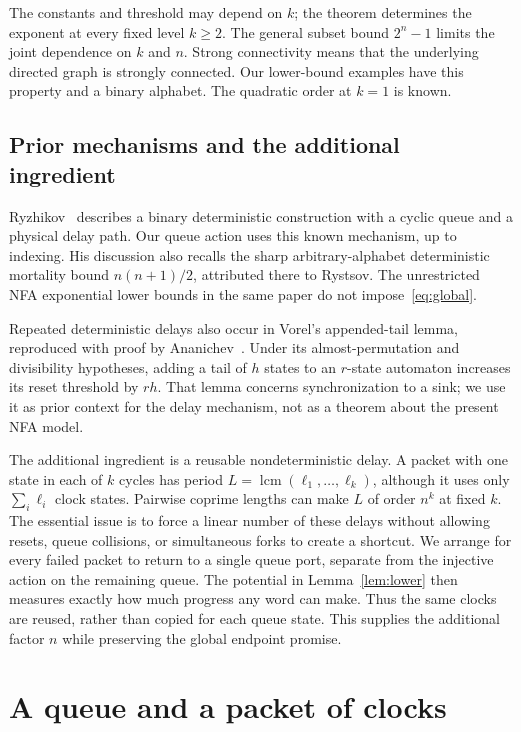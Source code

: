 \documentclass[acmsmall,screen,nonacm,11pt]{acmart}
\DeclareMathOperator{\lcm}{lcm}
\begin{document}
The constants and threshold may depend on $k$; the theorem determines the
exponent at every fixed level $k\geq2$. The general subset bound $2^n-1$
limits the joint dependence on $k$ and $n$. Strong connectivity means that
the underlying directed graph is strongly connected. Our lower-bound
examples have this property and a binary alphabet. The quadratic order
at $k=1$ is known.

\subsection{Prior mechanisms and the additional ingredient}

Ryzhikov~\cite[Section~4]{R2024} describes a binary deterministic construction
with a cyclic queue and a physical delay path. Our queue action uses this
known mechanism, up to indexing. His discussion also recalls the sharp
arbitrary-alphabet deterministic mortality bound $n(n+1)/2$, attributed
there to Rystsov. The unrestricted NFA exponential lower bounds in the same
paper do not impose~\eqref{eq:global}.

Repeated deterministic delays also occur in Vorel's appended-tail lemma,
reproduced with proof by Ananichev~\cite[Section~2, Lemma~2.1]{A2017}.
Under its almost-permutation and divisibility hypotheses, adding a tail of
$h$ states to an $r$-state automaton increases its reset threshold by $rh$.
That lemma concerns synchronization to a sink; we use it as prior context
for the delay mechanism, not as a theorem about the present NFA model.

The additional ingredient is a reusable nondeterministic delay. A packet
with one state in each of $k$ cycles has period
$L=\lcm(\ell_1,\ldots,\ell_k)$, although it uses only
$\sum_i\ell_i$ clock states. Pairwise coprime lengths can make $L$ of order
$n^k$ at fixed $k$. The essential issue is to force a linear number of these
delays without allowing resets, queue collisions, or simultaneous forks
to create a shortcut. We arrange for every failed packet to return to a
single queue port, separate from the injective action on the remaining
queue. The potential in Lemma~\ref{lem:lower} then measures exactly how much
progress any word can make. Thus the same clocks are reused, rather than
copied for each queue state. This supplies the additional factor $n$ while
preserving the global endpoint promise.

\section{A queue and a packet of clocks}
\end{document}
